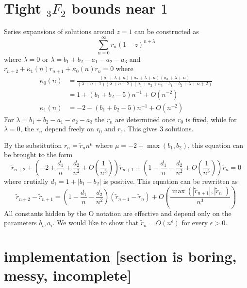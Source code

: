 \documentclass[12pt]{article}
\numberwithin{equation}{section}
\begin{document}
\section{Tight ${}_3 F_2$ bounds near $1$}

Series expansions of solutions around $z=1$ can be constructed as
\begin{equation*}
\sum_{n=0}^{\infty} r_n (1-z)^{n+\lambda}
\end{equation*}
where $\lambda =0$ or $\lambda = b_1+b_2-a_1-a_2-a_3$ and $r_{n+2} + \kappa_1(n) r_{n+1} + \kappa_0(n) r_n = 0$ where
\begin{align*}
\kappa_0(n) &= \frac{\left(a_1+\lambda +n\right) \left(a_2+\lambda
   +n\right) \left(a_3+\lambda +n\right)}{(\lambda +n+1)
   (\lambda +n+2) \left(a_1+a_2+a_3-b_1-b_2+\lambda
   +n+2\right)}\\
&=1 + \left(b_1+b_2-5 \right) n^{-1} + O(n^{-2})\\
\kappa_1(n) &=-2 - \left(b_1+b_2-5 \right) n^{-1} + O(n^{-2})
\end{align*}
For $\lambda = b_1+b_2-a_1-a_2-a_3$ the $r_n$ are determined once $r_0$ is fixed, while for $\lambda = 0$, the $r_n$ depend freely on $r_0$ and $r_1$. This gives $3$ solutions.

By the substitution $r_n = \tilde{r}_n n^\mu$ where $\mu = -2 + \operatorname{max}(b_1,b_2)$, this equation can be brought to the form
\begin{equation*}
\tilde{r}_{n+2} + \left(-2 + \frac{d_1}{n} + \frac{d_2}{n^2} + O(\frac{1}{n^3}) \right) \tilde{r}_{n+1} + \left(1 - \frac{d_1}{n} - \frac{d_2}{n^2} + O(\frac{1}{n^3}) \right) \tilde{r}_{n} = 0
\end{equation*}
where crutially $d_1 = 1 + |b_1-b_2|$ is positive. This equation can be rewritten as
\begin{equation*}
\tilde{r}_{n+2} - \tilde{r}_{n+1} = \left(1 - \frac{d_1}{n} - \frac{d_2}{n^2} \right) (\tilde{r}_{n+1} - \tilde{r}_{n}) + O(\frac{\operatorname{max}(|\tilde{r}_{n+1}|, |\tilde{r}_{n}|)}{n^3})
\end{equation*}
All constants hidden by the O notation are effective and depend only on the parameters $b_i,a_i$. We would like to show that $\tilde{r}_{n} = O(n^{\epsilon})$ for every $\epsilon > 0$.



\section{implementation [section is boring, messy, incomplete]}
\end{document}
